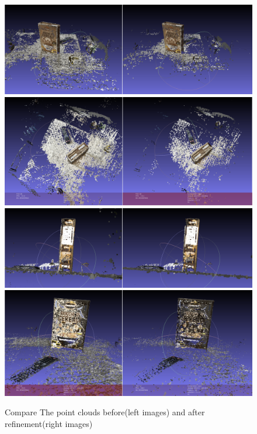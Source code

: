 \documentclass[11pt]{article}
\begin{document}
    \begin{figure}
    \centering
    \includegraphics[width=\textwidth,height=\textheight,keepaspectratio]{images/cereal.1.png}
    \includegraphics[width=\textwidth,height=\textheight,keepaspectratio]{images/cereal.2.png}
    \includegraphics[width=\textwidth,height=\textheight,keepaspectratio]{images/cereal.3.png}
    \includegraphics[width=\textwidth,height=\textheight,keepaspectratio]{images/cereal.4.png}
    \caption{Compare The point clouds before(left images) and after refinement(right images)}
    \label{fig:cereal}
    \end{figure}
    \clearpage
\end{document}
